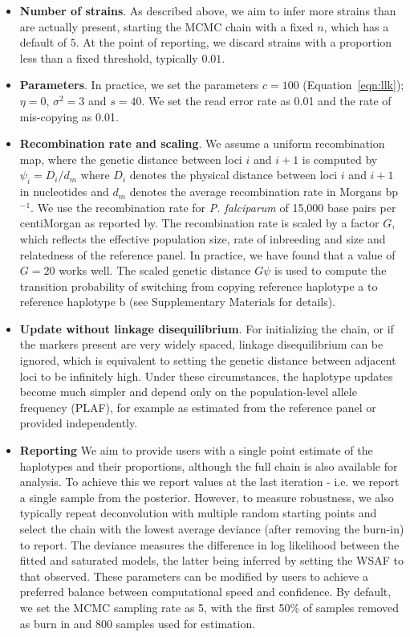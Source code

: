 \documentclass{nature}
\begin{document}
\begin{itemize}
\item {\bf Number of strains}. As described above, we aim to infer more strains than are actually present, starting the MCMC chain with a fixed $n$, which has a default of $5$. At the point of reporting, we discard strains with a proportion less than a fixed threshold, typically $0.01$.

\item {\bf Parameters}. In practice, we set the parameters $c=100$ (Equation~\eqref{eqn:llk}); $\eta = 0$, $\sigma^2 = 3$ and $s=40$.  We set the read error rate as 0.01 and the rate of mis-copying as 0.01.

\item {\bf Recombination rate and scaling}. We assume a uniform recombination map, where the genetic distance between loci $i$ and $i+1$ is computed by $\psi_i = D_i / d_m$ where $D_i$ denotes the physical distance between loci $i$ and $i+1$ in nucleotides and $d_m$ denotes the average recombination rate in Morgans bp$^{-1}$. We use the recombination rate for {\it P. falciparum} of 15,000 base pairs per centiMorgan as reported by\cite{Miles2016}. The recombination rate is scaled by a factor $G$, which reflects the effective population size, rate of inbreeding and size and relatedness of the reference panel.  In practice, we have found that a value of $G=20$ works well.  The scaled genetic distance $G\psi$ is used to compute the transition probability of switching from copying reference haplotype a to reference haplotype b (see Supplementary Materials for details).

\item {\bf Update without linkage disequilibrium}. For initializing the chain, or if the markers present are very widely spaced, linkage disequilibrium can be ignored, which is equivalent to setting the genetic distance between adjacent loci to be infinitely high.  Under these circumstances, the haplotype updates become much simpler and depend only on the population-level allele frequency (PLAF), for example as estimated from the reference panel or provided independently.

\item {\bf Reporting} We aim to provide users with a single point estimate of the haplotypes and their proportions, although the full chain is also available for analysis.  To achieve this we report values at the last iteration - i.e. we report a single sample from the posterior.  However, to measure robustness, we also typically repeat deconvolution with multiple random starting points and select the chain with the lowest average deviance (after removing the burn-in) to report. The deviance measures the difference in log likelihood between the fitted and saturated models, the latter being inferred by setting the WSAF to that observed.   These parameters can be modified by users to achieve a preferred balance between computational speed and confidence.  By default, we set the MCMC sampling rate as 5, with the first 50\% of samples removed as burn in and 800 samples used for estimation.


\end{itemize}
\end{document}
